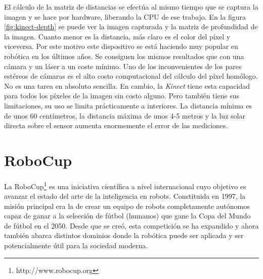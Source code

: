 \begin{figure}[h]
  \centering
\end{figure}

El cálculo de la matriz de distancias se efectúa al mismo tiempo que se captura la imagen y se hace por hardware, liberando la CPU de ese trabajo. En la figura \ref{fig:kinect-depth} se puede ver la imagen capturada y la matriz de profundidad de la imagen. Cuanto menor es la distancia, más claro es el color del píxel y viceversa. Por este motivo este dispositivo se está haciendo muy popular en robótica en los últimos años. Se consiguen los mismos resultados que con una cámara y un láser a un coste mínimo. Uno de los inconvenientes de los pares estéreos de cámaras es el alto costo computacional del cálculo del píxel homólogo. No es una tarea en absoluto sencilla. En cambio, la \textit{Kinect} tiene esta capacidad para todos los píxeles de la imagen sin costo alguno. Pero también tiene sus limitaciones, su uso se limita prácticamente a interiores. La distancia mínima es de unos 60 centímetros, la distancia máxima de unos 4-5 metros y la luz solar directa sobre el sensor aumenta enormemente el error de las mediciones. \\

\section{RoboCup}
\label{sec:robocup}

La RoboCup\footnote{http://www.robocup.org} es una iniciativa científica a nivel internacional cuyo objetivo es avanzar el estado del arte de la inteligencia en robots. Constituida en 1997, la misión principal era la de crear un equipo de robots completamente autónomos capaz de ganar a la selección de fútbol (humanos) que gane la Copa del Mundo de fútbol en el 2050. Desde que se creó, esta competición se ha expandido y ahora también abarca distintos dominios donde la robótica puede ser aplicada y ser potencialmente útil para la sociedad moderna. \\


